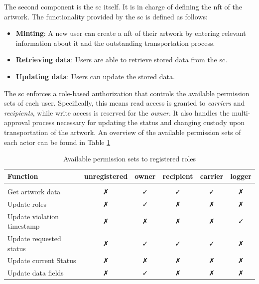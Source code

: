 The second component is the \gls{sc} itself. It is in charge of defining the \gls{nft} of the artwork. 
The functionality provided by the \gls{sc} is defined as follows:

\begin{itemize}[align=left, font=\textit]
    \item \textbf{Minting}: A new user can create a \gls{nft} of their artwork by entering relevant information about it and the outstanding transportation process.
    \item \textbf{Retrieving data}: Users are able to retrieve stored data from the \gls{sc}.
    \item \textbf{Updating data}: Users can update the stored data.
\end{itemize}

The \gls{sc} enforces a role-based authorization that controls the available permission sets of each user. Specifically, this means read access is granted to \textit{carriers} and \textit{recipients}, while write access is reserved for the \textit{owner}. It also handles the multi-approval process necessary for updating the status and changing custody upon transportation of the artwork. An overview of the available permission sets of each actor can be found in Table \ref{tab:permission_sets}

\begin{table}
\begin{tabular}{l|ccccc}
\textbf{Function}          & \textbf{unregistered} & \textbf{owner}       & \textbf{recipient}   & \textbf{carrier}     & \textbf{logger}      \\ \hline
                           & \multicolumn{1}{l}{}  & \multicolumn{1}{l}{} & \multicolumn{1}{l}{} & \multicolumn{1}{l}{} & \multicolumn{1}{l}{} \\
Get artwork data           & ✗                     & ✓                    & ✓                    & ✓                    & ✗                    \\
Update roles               & ✗                     & ✓                    & ✗                    & ✗                    & ✗                    \\
Update violation timestamp & ✗                     & ✗                    & ✗                    & ✗                    & ✓                    \\
Update requested status    & ✗                     & ✓                    & ✓                    & ✓                    & ✗                    \\
Update current Status      & ✗                     & ✗                    & ✗                    & ✗                    & ✗                    \\
Update data fields         & ✗                     & ✓                    & ✗                    & ✗                    & ✗                   
\end{tabular}
\caption{Available permission sets to registered roles}
\label{tab:permission_sets}
\end{table}

